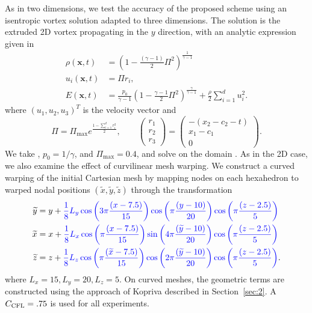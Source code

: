 \documentclass[review,onefignum,onetabnum,final]{siamart171218}
\renewcommand{\tilde}{\widetilde}
\newcommand{\LRp}[1]{\left( #1 \right)}
\newcommand{\note}[1]{{\color{blue}{#1}}}
\begin{document}
As in two dimensions, we test the accuracy of the proposed scheme using an isentropic vortex solution adapted to three dimensions.  The solution is the extruded 2D vortex propagating in the $y$ direction, with an analytic expression given in \cite{williams2013nodal}
\begin{align*}
\rho(\bm{x},t) &= \LRp{1-\frac{(\gamma-1)}{2}\Pi^2}^{\frac{1}{\gamma-1}}\\
u_i(\bm{x},t) &= \Pi r_i, \\
E(\bm{x},t) &= \frac{p_0}{\gamma-1}\LRp{1-\frac{\gamma-1}{2}\Pi^2}^{\frac{\gamma}{\gamma-1}} + \frac{\rho}{2}\sum_{i=1}^d u_i^2.
\end{align*}
where $(u_1,u_2,u_3)^T$ is the velocity vector and %
\[
\Pi = \Pi_{\max}e^{\frac{1-\sum_{i=1}^dr_i^2}{2}}, \qquad \begin{pmatrix}r_1\\r_2\\r_3\end{pmatrix} = \begin{pmatrix}
-(x_2-c_2-t)\\
x_1-c_1\\
0
\end{pmatrix}.
\]
We take \note{$c_1 = c_2 = 7.5$}, $p_0 = {1}/{\gamma}$, and $\Pi_{\max} = 0.4$, and solve on the domain \note{$[0,15]\times [0,20]\times [0,5]$ until final time $T=5$.  We decompose the domain into uniform hexahedral elements with edge length $h$}.  As in the 2D case, we also examine the effect of curvilinear mesh warping.  We construct a curved warping of the initial Cartesian mesh by mapping nodes on each hexahedron to warped nodal positions $(\tilde{x},\tilde{y},\tilde{z})$ through the transformation
\begin{align*}
\tilde{y} &= y + \note{\frac{1}{8}L_y\cos\LRp{3\pi \frac{(x-7.5)}{15}}\cos\LRp{\pi \frac{(y-10)}{20}}\cos\LRp{\pi \frac{(z-2.5)}{5}}}\\
\tilde{x} &= x + \note{\frac{1}{8}L_x\cos\LRp{\pi \frac{(x-7.5)}{15}}\sin\LRp{4\pi \frac{(\tilde{y}-10)}{20}}\cos\LRp{\pi \frac{(z-2.5)}{5}}}\\
\tilde{z} &= z + \note{\frac{1}{8}L_z\cos\LRp{\pi \frac{(\tilde{x}-7.5)}{15}}\cos\LRp{2\pi \frac{(\tilde{y}-10)}{20}}\cos\LRp{\pi \frac{(z-2.5)}{5}}}.
\end{align*} 
where $L_x = 15, L_y = 20, L_z = 5$.  
On curved meshes, the geometric terms are constructed using the approach of Kopriva described in Section~\ref{sec:2}.  A $C_{\rm CFL} = .75$ is used for all experiments.  
\end{document}
